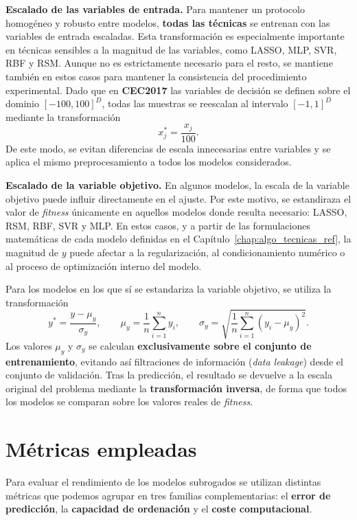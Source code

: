 \textbf{Escalado de las variables de entrada.} Para mantener un protocolo homogéneo y robusto entre modelos, \textbf{todas las técnicas} se entrenan con las variables de entrada escaladas. Esta transformación es especialmente importante en técnicas sensibles a la magnitud de las variables, como LASSO, MLP, SVR, RBF y RSM. Aunque no es estrictamente necesario para el resto, se mantiene también en estos casos para mantener la consistencia del procedimiento experimental. Dado que en \textbf{CEC2017} las variables de decisión se definen sobre el dominio \([-100,100]^{D}\), todas las muestras se reescalan al intervalo \([-1,1]^{D}\) mediante la transformación \[
    x_{j}^{\ast} = \frac{x_{j}}{100}.
\]
De este modo, se evitan diferencias de escala innecesarias entre variables y se aplica el mismo preprocesamiento a todos los modelos considerados.

\textbf{Escalado de la variable objetivo.} En algunos modelos, la escala de la variable objetivo puede influir directamente en el ajuste. Por este motivo, se estandiraza el valor de \textit{fitness} únicamente en aquellos modelos donde resulta necesario: LASSO, RSM, RBF, SVR y MLP. En estos casos, y a partir de las formulaciones matemáticas de cada modelo definidas en el Capítulo~\ref{chap:algo_tecnicas_ref}, la magnitud de \(y\) puede afectar a la regularización, al condicionamiento numérico o al proceso de optimización interno del modelo.

Para los modelos en los que sí se estandariza la variable objetivo, se utiliza la transformación
\[
    y^{\ast} = \frac{y - \mu_{y}}{\sigma_{y}}, \qquad
    \mu_{y} = \frac{1}{n}\sum_{i=1}^{n} y_{i}, \qquad
    \sigma_{y} = \sqrt{\frac{1}{n}\sum_{i=1}^{n} (y_{i} - \mu_{y})^{2}}.
\]
Los valores $\mu_{y}$ y $\sigma_{y}$ se calculan \textbf{exclusivamente sobre el conjunto de entrenamiento}, evitando así filtraciones de información (\textit{data leakage}) desde el conjunto de validación. Tras la predicción, el resultado se devuelve a la escala original del problema mediante la \textbf{transformación inversa}, de forma que todos los modelos se comparan sobre los valores reales de  \textit{fitness}.

\section{Métricas empleadas}

Para evaluar el rendimiento de los modelos subrogados se utilizan distintas métricas que podemos agrupar en tres familias complementarias: el \textbf{error de predicción}, la \textbf{capacidad de ordenación} y el \textbf{coste computacional}.

